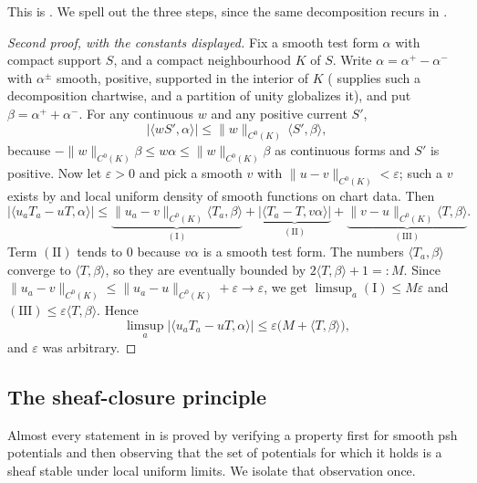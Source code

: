 This is \cite[Lemma~8.5.1]{CLD25}.  We spell out the three steps, since the
same decomposition recurs in
.

\begin{proof}[Second proof, with the constants displayed]
Fix a smooth test form $\alpha$ with compact support $S$, and a compact
neighbourhood $K$ of $S$.  Write $\alpha=\alpha^+-\alpha^-$ with
$\alpha^\pm$ smooth, positive, supported in the interior of $K$
( supplies such a decomposition
chartwise, and a partition of unity globalizes it), and put
$\beta=\alpha^++\alpha^-$.  For any continuous $w$ and any positive current
$S'$,
\begin{equation}
\label{eq:ch16-positivity-sandwich}
 |\langle wS',\alpha\rangle|
 \leq\|w\|_{C^0(K)}\,\langle S',\beta\rangle ,
\end{equation}
because $-\|w\|_{C^0(K)}\beta\leq w\alpha\leq\|w\|_{C^0(K)}\beta$ as
continuous forms and $S'$ is positive.  Now let $\varepsilon>0$ and pick a
smooth $v$ with $\|u-v\|_{C^0(K)}<\varepsilon$; such a $v$ exists by
 and local uniform density of smooth
functions on chart data.  Then
\[
 |\langle u_aT_a-uT,\alpha\rangle|
 \leq\underbrace{\|u_a-v\|_{C^0(K)}\langle T_a,\beta\rangle}_{(\mathrm I)}
   +\underbrace{|\langle T_a-T,v\alpha\rangle|}_{(\mathrm{II})}
   +\underbrace{\|v-u\|_{C^0(K)}\langle T,\beta\rangle}_{(\mathrm{III})}.
\]
Term $(\mathrm{II})$ tends to $0$ because $v\alpha$ is a smooth test form.
The numbers $\langle T_a,\beta\rangle$ converge to $\langle T,\beta\rangle$,
so they are eventually bounded by $2\langle T,\beta\rangle+1=:M$.  Since
$\|u_a-v\|_{C^0(K)}\leq\|u_a-u\|_{C^0(K)}+\varepsilon\to\varepsilon$, we get
$\limsup_a(\mathrm I)\leq M\varepsilon$ and
$(\mathrm{III})\leq\varepsilon\langle T,\beta\rangle$.  Hence
\[
 \limsup_a|\langle u_aT_a-uT,\alpha\rangle|
 \leq\varepsilon\bigl(M+\langle T,\beta\rangle\bigr),
\]
and $\varepsilon$ was arbitrary.
\end{proof}

\subsection{The sheaf-closure principle}
\label{sec:ch16-sheaf-closure}

Almost every statement in
 is proved by verifying
a property first for smooth psh potentials and then observing that the set
of potentials for which it holds is a sheaf stable under local uniform
limits.  We isolate that observation once.

